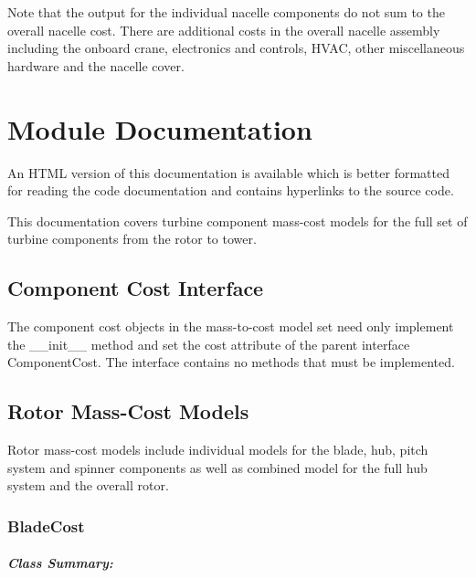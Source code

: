\documentclass[letterpaper,10pt,openany,oneside]{sphinxmanual}
\begin{document}
Note that the output for the individual nacelle components do not sum to the overall nacelle cost.  There are additional costs in the overall nacelle assembly including the onboard crane, electronics and controls, HVAC, other miscellaneous hardware and the nacelle cover.


\chapter{Module Documentation}
\label{documentation::doc}\label{documentation:module-documentation}
An HTML version of this documentation is available which is better formatted for reading the code documentation and contains hyperlinks to the source code.

This documentation covers turbine component mass-cost models for the full set of turbine components from the rotor to tower.


\section{Component Cost Interface}
\label{documentation:component-cost-interface}
The component cost objects in the mass-to-cost model set need only implement the \_\_init\_\_ method and set the cost attribute of the parent interface ComponentCost.  The interface contains no methods that must be implemented.


\section{Rotor Mass-Cost Models}
\label{documentation:rotor-mass-cost-models}
Rotor mass-cost models include individual models for the blade, hub, pitch system and spinner components as well as combined model for the full hub system and the overall rotor.


\subsection{BladeCost}
\label{documentation:bladecost}\label{documentation:bladecost-class-label}\paragraph{Class Summary:}
\end{document}
